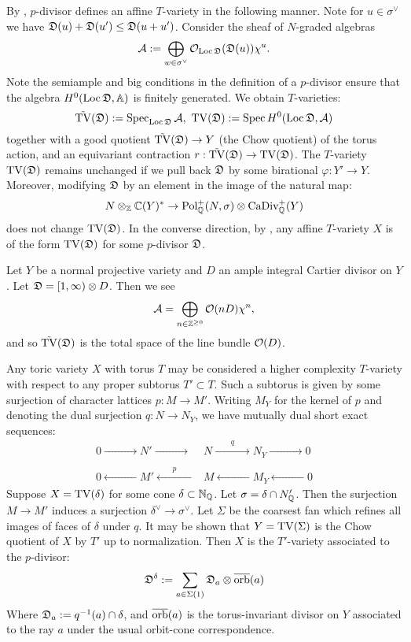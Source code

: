 By \cite[Proposition 3.1]{hausen2018torus}, \(p\)-divisor defines an affine \(T\)-variety in the following manner. Note for \(u \in \sigma^\vee\) we have \({\mathfrak{D}}(u) + {\mathfrak{D}}(u') \le {\mathfrak{D}}(u+u')\). Consider the sheaf of \(N\)-graded algebras
\[
\mathcal{A} := \bigoplus_{w \in \sigma^{\vee}} \mathcal{O}_{\operatorname{Loc} {\mathfrak{D}}} ({\mathfrak{D}}(u)) \chi^u.
\]
Note the semiample and big conditions in the definition of a \(p\)-divisor ensure that the algebra \(H^0(\operatorname{Loc} {\mathfrak{D}}, \mathbb{A})\) is finitely generated. We obtain \(T\)-varieties:
\[
\tilde{\operatorname{TV}}({\mathfrak{D}}) := \operatorname{Spec}_{\operatorname{Loc} {\mathfrak{D}}} \mathcal{A} , \ \operatorname{TV}({\mathfrak{D}}) := \operatorname{Spec} H^0(\operatorname{Loc} {\mathfrak{D}}, \mathcal{A})
\]
together with a good quotient \(\tilde{\operatorname{TV}}({\mathfrak{D}}) \to Y\) (the Chow quotient) of the torus action, and an equivariant contraction \(r: \tilde{\operatorname{TV}}({\mathfrak{D}}) \to \operatorname{TV}({\mathfrak{D}}) \). The \(T\)-variety \(\operatorname{TV}({\mathfrak{D}})\) remains unchanged if we pull back \({\mathfrak{D}}\) by some birational \(\varphi: Y' \to Y\). Moreover, modifying \({\mathfrak{D}}\) by an element in the image of the natural map:
\[
N \otimes_{\mathbb{Z}} \mathbb{C}(Y)^* \to \operatorname{Pol}_{\mathbb{Q}}^+(N,\sigma) \otimes \operatorname{CaDiv}_{\mathbb{Q}}^+(Y)
\]
does not change \(\operatorname{TV}({\mathfrak{D}})\). In the converse direction, by \cite[Proposition 3.4]{hausen2018torus}, any affine \(T\)-variety \(X\) is of the form \(\operatorname{TV}({\mathfrak{D}})\) for some \(p\)-divisor \({\mathfrak{D}}\).
\begin{example}
Let \(Y\) be a normal projective variety and \(D\) an ample integral Cartier divisor on \(Y\). Let \({\mathfrak{D}} = [1,\infty) \otimes D\). Then we see
\[
\mathcal{A} = \bigoplus_{n \in \mathbb{Z}^{\ge 0}} \mathcal{O} (n D) \chi^n,
\]
and so \(\tilde{\operatorname{TV}}({\mathfrak{D}})\) is the total space of the line bundle \(\mathcal{O}(D)\).
\end{example}
\begin{example}
Any toric variety \(X\) with torus \(T\) may be considered a higher complexity \(T\)-variety with respect to any proper subtorus \(T' \subset T\). Such a subtorus is given by some surjection of character lattices \(p: M \to M'\). Writing \(M_Y\) for the kernel of \(p\) and denoting the dual surjection \(q:N \to N_Y\), we have mutually dual short exact sequences:
\begin{align*}
0 \xrightarrow{\qquad \ \qquad} N' \xrightarrow{\qquad \ \qquad}&N \xrightarrow{\qquad q \qquad} N_Y \xrightarrow{\qquad \ \qquad} 0 \\ &\ \\
0 \xleftarrow{\qquad \ \qquad} M' \xleftarrow{\qquad p \qquad}&M \xleftarrow{\qquad \ \qquad} M_Y \xleftarrow{\qquad \ \qquad} 0
\end{align*}
Suppose \(X = \operatorname{TV}(\delta)\) for some cone \(\delta \subset \mathbb{N}_{\mathbb{Q}}\). Let \(\sigma = \delta \cap N'_{\mathbb{Q}}\). Then the surjection \(M \to M'\) induces a surjection \(\delta^\vee \to \sigma^\vee\). Let \(\Sigma\) be the coarsest fan which refines all images of faces of \(\delta\) under \(q\). It may be shown that \(Y = \operatorname{TV}(\Sigma)\) is the Chow quotient of \(X\) by \(T'\) up to normalization. Then \(X\) is the \(T'\)-variety associated to the \(p\)-divisor:
\[
{\mathfrak{D}}^\delta := \sum_{a \in \Sigma(1)}  {\mathfrak{D}}_a \otimes \overline{\operatorname{orb}}(a)
\]
Where \({\mathfrak{D}}_a := q^{-1}(a) \cap \delta\), and \(\overline{\operatorname{orb}}(a)\) is the torus-invariant divisor on \(Y\) associated to the ray \(a\) under the usual orbit-cone correspondence.
\end{example}
